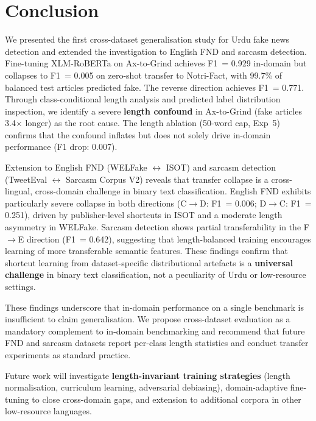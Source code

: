 \documentclass[conference]{IEEEtran}
\begin{document}
\section{Conclusion}
\label{sec:conclusion}

We presented the first cross-dataset generalisation study for Urdu
fake news detection and extended the investigation to English FND and
sarcasm detection. Fine-tuning XLM-RoBERTa on Ax-to-Grind achieves
F1~= 0.929 in-domain but collapses to F1~= 0.005 on zero-shot
transfer to Notri-Fact, with 99.7\% of balanced test articles
predicted fake. The reverse direction achieves F1~= 0.771. Through
class-conditional length analysis and predicted label distribution
inspection, we identify a severe \textbf{length confound} in
Ax-to-Grind (fake articles 3.4$\times$ longer) as the root cause.
The length ablation (50-word cap, Exp~5) confirms that the confound
inflates but does not solely drive in-domain performance (F1 drop:
0.007).

Extension to English FND (WELFake $\leftrightarrow$ ISOT) and
sarcasm detection (TweetEval $\leftrightarrow$ Sarcasm Corpus V2)
reveals that transfer collapse is a cross-lingual, cross-domain
challenge in binary text classification. English FND exhibits
particularly severe collapse in both directions (C$\to$D: F1~= 0.006;
D$\to$C: F1~= 0.251), driven by publisher-level shortcuts in ISOT and
a moderate length asymmetry in WELFake. Sarcasm detection shows
partial transferability in the F$\to$E direction (F1~= 0.642),
suggesting that length-balanced training encourages learning of more
transferable semantic features. These findings confirm that shortcut
learning from dataset-specific distributional artefacts is a
\textbf{universal challenge} in binary text classification, not a
peculiarity of Urdu or low-resource settings.

These findings underscore that in-domain performance on a single
benchmark is insufficient to claim generalisation. We propose
cross-dataset evaluation as a mandatory complement to in-domain
benchmarking and recommend that future FND and sarcasm datasets
report per-class length statistics and conduct transfer experiments
as standard practice.

Future work will investigate \textbf{length-invariant training
strategies} (length normalisation, curriculum learning, adversarial
debiasing), domain-adaptive fine-tuning to close cross-domain gaps,
and extension to additional corpora in other low-resource languages.
\end{document}
